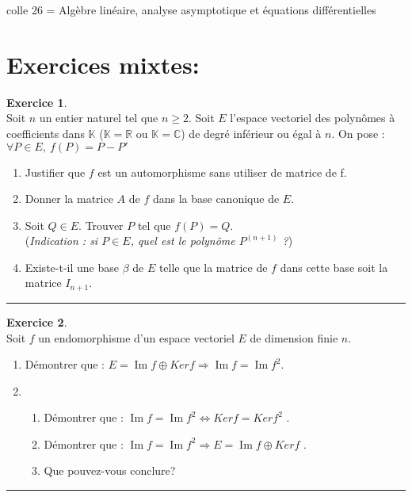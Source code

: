 \documentclass[a4paper,10pt]{article}
\theoremstyle{definition}
\theoremstyle{definition}
\newtheorem{exo}{Exercice}
\newcommand{\K}{\mathbb{K}}
\newcommand{\C}{\mathbb{C}}
\newcommand{\R}{\mathbb{R}}
\renewcommand{\Im}{\mathop{\mathrm{Im}}\nolimits}
\begin{document}
 	

\begin{center}
\Large \sc colle 26 = Algèbre linéaire, analyse asymptotique et équations différentielles
\end{center}

\section*{Exercices mixtes:}%

\raggedright

\begin{exo}\textbf{}\quad\\[0.25cm]
Soit $n$ un entier naturel tel que $n \geq 2$.
Soit $E$ l’espace vectoriel des polynômes à coefficients dans $\K$ ($\K = \R$ ou $\K = \C$) de degré inférieur ou égal à $n$.
On pose : \ $ \forall P \in E, \  f (P) = P - P'$
\begin{enumerate}
	\item Justifier que $f$ est un automorphisme sans utiliser de matrice de f.
	\item Donner la matrice $A$ de $f$ dans la base canonique de $E$.
	 \item Soit $Q \in E$. Trouver $P$ tel que $f (P) = Q$.\\
	(\textit{Indication : si $P \in E$, quel est le polynôme $P^{(n+1)}$ ?})
	\item Existe-t-il une base $\beta$ de $E$ telle que la matrice de $f$ dans cette base soit la matrice $I_{n+1}$. 
	
\end{enumerate}

\centering
\rule{1\linewidth}{0.6pt}
\end{exo}

\begin{exo}\textbf{}\quad\\[0.25cm]
Soit $f$ un endomorphisme d’un espace vectoriel $E$ de dimension finie $n$.
\begin{enumerate}
	\item Démontrer que : $E = \Im f \oplus Ker f \Rightarrow \Im f = \Im f^2$.
	\item \begin{enumerate}
		\item Démontrer que : $\Im f = \Im f^2 \Longleftrightarrow Ker f = Kerf^2$ .
		\item Démontrer que : $\Im f = \Im f^2 \Rightarrow E = \Im f \oplus Kerf$ .
		\item Que pouvez-vous conclure? 
	\end{enumerate}
\end{enumerate}

\centering
\rule{1\linewidth}{0.6pt}
\end{exo}
\end{document}
